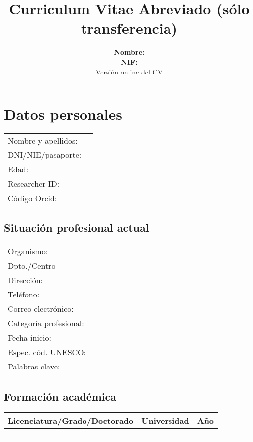 \documentclass[a4paper]{article}
\title{Curriculum Vitae Abreviado (sólo transferencia)}
\author{
  \begin{tabular}{ll}
    \textbf{Nombre:} &  \\
    \textbf{NIF:} &  \\
    \multicolumn{2}{c}{\href{http://www.hpca.ual.es/~vruiz}{Versión online del CV}}
  \end{tabular}
}
\begin{document}
\def\normalfont{\sffamily}
\sffamily
\maketitle

\section{Datos personales}
\begin{tabular}{ll}
  Nombre y apellidos: &   \\
  DNI/NIE/pasaporte: &  \\
  Edad: &  \\
  Researcher ID: &  \\
  Código Orcid: & 
\end{tabular}

\subsection{Situación profesional actual}

\begin{tabular}{ll}
  Organismo: &  \\
  Dpto./Centro &  \\
  Dirección: &  \\
  Teléfono: &  \\
  Correo electrónico: &  \\
  Categoría profesional: &  \\
  Fecha inicio: &  \\
  Espec. cód. UNESCO: &  \\
  Palabras clave: & 
\end{tabular}

\subsection{Formación académica}

\begin{tabular}{lll}
  Licenciatura/Grado/Doctorado & Universidad & Año \\
  \hline
   &  &  \\
   &  &  \\
   &  & 
\end{tabular}
\end{document}
